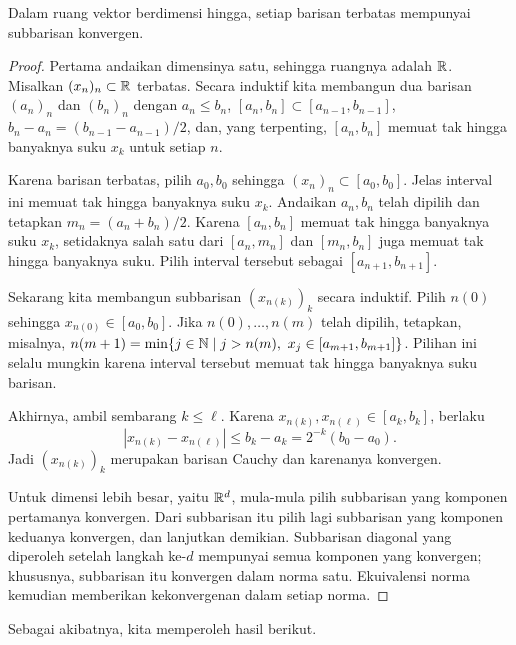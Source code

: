\begin{theorem}\label{thm:bolzano}
    Dalam ruang vektor berdimensi hingga, setiap barisan terbatas mempunyai
    subbarisan konvergen.
\end{theorem}

\begin{proof}
    Pertama andaikan dimensinya satu, sehingga ruangnya adalah $\mathbb{R}$. Misalkan
    $(x_n)_n\subset\mathbb{R}$ terbatas. Secara induktif kita membangun dua barisan
    $(a_n)_n$ dan $(b_n)_n$ dengan
    $a_n\leq b_n$, $[a_n,b_n]\subset[a_{n-1},b_{n-1}]$,
    $b_n-a_n=(b_{n-1}-a_{n-1})/2$, dan, yang terpenting, $[a_n,b_n]$
    memuat tak hingga banyaknya suku $x_k$ untuk setiap $n$.

    Karena barisan terbatas, pilih $a_0,b_0$ sehingga
    $(x_n)_n\subset[a_0,b_0]$. Jelas interval ini memuat tak hingga banyaknya
    suku $x_k$. Andaikan $a_n,b_n$ telah dipilih dan tetapkan
    $m_n=(a_n+b_n)/2$. Karena $[a_n,b_n]$ memuat tak hingga banyaknya suku
    $x_k$, setidaknya salah satu dari $[a_n,m_n]$ dan $[m_n,b_n]$ juga memuat
    tak hingga banyaknya suku. Pilih interval tersebut sebagai
    $[a_{n+1},b_{n+1}]$.

    Sekarang kita membangun subbarisan $(x_{n(k)})_k$ secara induktif. Pilih
    $n(0)$ sehingga $x_{n(0)}\in[a_0,b_0]$. Jika $n(0),\ldots,n(m)$ telah
    dipilih, tetapkan, misalnya,
    $n(m+1)=\min\{j\in\N\mid j>n(m),\ x_j\in[a_{m+1},b_{m+1}]\}$.
    Pilihan ini selalu mungkin karena interval tersebut memuat tak hingga
    banyaknya suku barisan.

    Akhirnya, ambil sembarang $k\leq\ell$. Karena
    $x_{n(k)},x_{n(\ell)}\in[a_k,b_k]$, berlaku
    \begin{equation}
        |x_{n(k)}-x_{n(\ell)}|
        \leq b_k-a_k=2^{-k}(b_0-a_0).
    \end{equation}
    Jadi $(x_{n(k)})_k$ merupakan barisan Cauchy dan karenanya konvergen.

    Untuk dimensi lebih besar, yaitu $\mathbb{R}^d$, mula-mula pilih subbarisan yang
    komponen pertamanya konvergen. Dari subbarisan itu pilih lagi subbarisan
    yang komponen keduanya konvergen, dan lanjutkan demikian. Subbarisan
    diagonal yang diperoleh setelah langkah ke-$d$ mempunyai semua komponen
    yang konvergen; khususnya, subbarisan itu konvergen dalam norma satu.
    Ekuivalensi norma kemudian memberikan kekonvergenan dalam setiap norma.
\end{proof}

Sebagai akibatnya, kita memperoleh hasil berikut.

